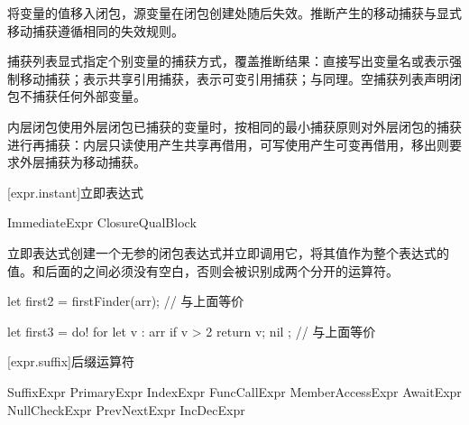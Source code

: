 \pnum
{}将变量的值移入闭包，源变量在闭包创建处随后失效。推断产生的移动捕获与显式移动捕获遵循相同的失效规则。

\pnum
捕获列表显式指定个别变量的捕获方式，覆盖推断结果：直接写出变量名或表示强制移动捕获；表示共享引用捕获，表示可变引用捕获；与同理。空捕获列表\tcode{[]}声明闭包不捕获任何外部变量。

\pnum
内层闭包使用外层闭包已捕获的变量时，按相同的最小捕获原则对外层闭包的捕获进行再捕获：内层只读使用产生共享再借用，可写使用产生可变再借用，移出则要求外层捕获为移动捕获。

\enterexample
{}
\exitexample

[expr.instant]{立即表达式}

\begin{bnf}{ImmediateExpr}
     ClosureQual\bnfs Block
\end{bnf}

\pnum
立即表达式创建一个无参的闭包表达式并立即调用它，将其值作为整个表达式的值。\enternote {}和后面的\tcode{!}之间必须没有空白，否则会被识别成两个分开的运算符。\exitnote

\enterexample
\begin{codeblock}
let first2 = firstFinder(arr); // 与上面等价

let first3 = do! {
    for let v : arr {
        if v > 2 { return v; }
    }
    nil
}; // 与上面等价

\end{codeblock}
\exitexample

[expr.suffix]{后缀运算符}

\begin{bnf}{SuffixExpr}
    PrimaryExpr \br
    IndexExpr \br
    FuncCallExpr \br
    MemberAccessExpr \br
    AwaitExpr \br
    NullCheckExpr \br
    PrevNextExpr \br
    IncDecExpr
\end{bnf}

